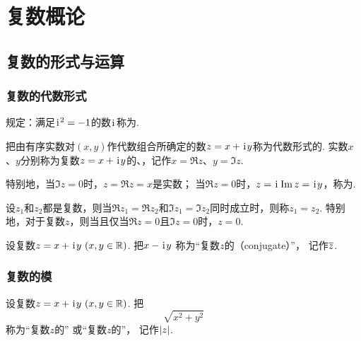 \chapter{复数概论}
\section{复数的形式与运算}
\subsection{复数的代数形式}
\begin{definition}%
规定：满足\(\kern1pt\mathrm{i}\kern1pt^2=-1\)的数\(\kern1pt\mathrm{i}\kern1pt\)称为.
\end{definition}

\begin{definition}
把由有序实数对\((x,y)\)作代数组合所确定的数\(z = x + \kern1pt\mathrm{i}\kern1pt y\)称为代数形式的.
实数\(x\)、\(y\)分别称为复数\(z = x + \kern1pt\mathrm{i}\kern1pt y\)的、，记作\(x=\Re z\)、\(y=\Im z\).

特别地，当\(\Im z = 0\)时，\(z=\Re z = x\)是实数；
当\(\Re z = 0\)时，\(z = \kern1pt\mathrm{i}\kern1pt \Im z = \kern1pt\mathrm{i}\kern1pt y\)，称为.
\end{definition}

\begin{definition}%
设\(z_1\)和\(z_2\)都是复数，则当\(\Re z_1 = \Re z_2\)和\(\Im z_1 = \Im z_2\)同时成立时，则称\(z_1 = z_2\).
特别地，对于复数\(z\)，则当且仅当\(\Re z = 0\)且\(\Im z = 0\)时，\(z = 0\).
\end{definition}

\begin{definition}%
设复数\(z = x + \kern1pt\mathrm{i}\kern1pt y\ (x,y \in \mathbb{R})\).
把\(x - \kern1pt\mathrm{i}\kern1pt y\)
称为“复数\(z\)的（conjugate）”，
记作\(\overline{z}\).
\end{definition}

\subsection{复数的模}
\begin{definition}%
设复数\(z = x + \kern1pt\mathrm{i}\kern1pt y\ (x,y \in \mathbb{R})\).
把\begin{equation*}
	\sqrt{x^2 + y^2}
\end{equation*}
称为“复数\(z\)的”
或“复数\(z\)的”，
记作\(\abs{z}\).
\end{definition}

